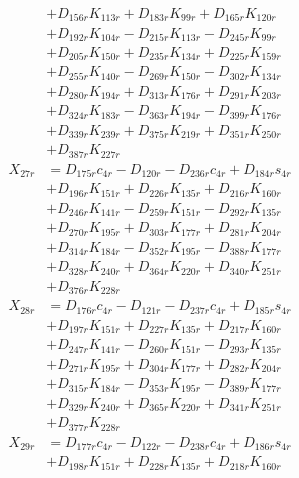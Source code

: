 \begin{multicols}{2}
\begin{align}
&+ D_{156r}K_{113r} + D_{183r}K_{99r} + D_{165r}K_{120r}  \nonumber \\
&+ D_{192r}K_{104r} - D_{215r}K_{113r} - D_{245r}K_{99r}  \nonumber \\
&+ D_{205r}K_{150r} + D_{235r}K_{134r} + D_{225r}K_{159r}  \nonumber \\
&+ D_{255r}K_{140r} - D_{269r}K_{150r} - D_{302r}K_{134r}  \nonumber \\
&+ D_{280r}K_{194r} + D_{313r}K_{176r} + D_{291r}K_{203r}  \nonumber \\
&+ D_{324r}K_{183r} - D_{363r}K_{194r} - D_{399r}K_{176r}  \nonumber \\
&+ D_{339r}K_{239r} + D_{375r}K_{219r} + D_{351r}K_{250r}  \nonumber \\
&+ D_{387r}K_{227r} \nonumber \\
X_{27r} &= D_{175r}c_{4r} - D_{120r} - D_{236r}c_{4r} + D_{184r}s_{4r}  \nonumber \\
&+ D_{196r}K_{151r} + D_{226r}K_{135r} + D_{216r}K_{160r}  \nonumber \\
&+ D_{246r}K_{141r} - D_{259r}K_{151r} - D_{292r}K_{135r}  \nonumber \\
&+ D_{270r}K_{195r} + D_{303r}K_{177r} + D_{281r}K_{204r}  \nonumber \\
&+ D_{314r}K_{184r} - D_{352r}K_{195r} - D_{388r}K_{177r}  \nonumber \\
&+ D_{328r}K_{240r} + D_{364r}K_{220r} + D_{340r}K_{251r}  \nonumber \\
&+ D_{376r}K_{228r} \nonumber \\
X_{28r} &= D_{176r}c_{4r} - D_{121r} - D_{237r}c_{4r} + D_{185r}s_{4r}  \nonumber \\
&+ D_{197r}K_{151r} + D_{227r}K_{135r} + D_{217r}K_{160r}  \nonumber \\
&+ D_{247r}K_{141r} - D_{260r}K_{151r} - D_{293r}K_{135r}  \nonumber \\
&+ D_{271r}K_{195r} + D_{304r}K_{177r} + D_{282r}K_{204r}  \nonumber \\
&+ D_{315r}K_{184r} - D_{353r}K_{195r} - D_{389r}K_{177r}  \nonumber \\
&+ D_{329r}K_{240r} + D_{365r}K_{220r} + D_{341r}K_{251r}  \nonumber \\
&+ D_{377r}K_{228r} \nonumber \\
X_{29r} &= D_{177r}c_{4r} - D_{122r} - D_{238r}c_{4r} + D_{186r}s_{4r}  \nonumber \\
&+ D_{198r}K_{151r} + D_{228r}K_{135r} + D_{218r}K_{160r}  \nonumber \\

\end{align}
\end{multicols}
